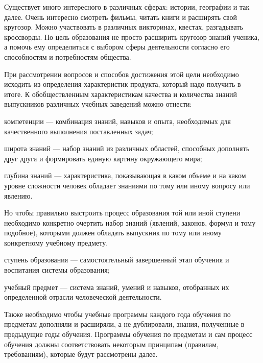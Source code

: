 Существует много интересного в различных сферах: истории, географии и так далее. Очень интересно смотреть фильмы, читать книги и расширять свой кругозор. Можно участвовать в различных викторинах, квестах, разгадывать кроссворды. Но цель образования не просто расширить кругозор знаний ученика, а помочь ему определиться с выбором сферы деятельности согласно его способностям и потребностям общества.

При рассмотрении вопросов и способов достижения этой цели необходимо исходить из определения характеристик продукта, который надо получить в итоге. К обобществленным характеристикам качества и количества знаний выпускников различных учебных заведений можно отнести:
\begin{textitemize}
	\item компетенции --- комбинация знаний, навыков и опыта, необходимых для качественного выполнения поставленных задач;
	\item широта знаний --- набор знаний из различных областей, способных дополнять друг друга и формировать единую картину окружающего мира;
	\item глубина знаний --- характеристика, показывающая в каком объеме и на каком уровне сложности человек обладает знаниями по тому или иному вопросу или явлению.
\end{textitemize}

Но чтобы правильно выстроить процесс образования той или иной ступени необходимо конкретно очертить набор знаний (явлений, законов, формул и тому подобное), которыми должен обладать выпускник по тому или иному конкретному учебному предмету.
\begin{textitemize}
	\item ступень образования --- самостоятельный завершенный этап обучения и воспитания системы образования;
	\item учебный предмет --- система знаний, умений и навыков, отобранных их определенной отрасли человеческой деятельности.
\end{textitemize}

Также необходимо чтобы учебные программы каждого года обучения по предметам дополняли и расширяли, а не дублировали, знания, полученные в предыдущие годы обучения. Программы обучения по предметам и сам процесс обучения должны соответствовать некоторым принципам (правилам, требованиям), которые будут рассмотрены далее.  

